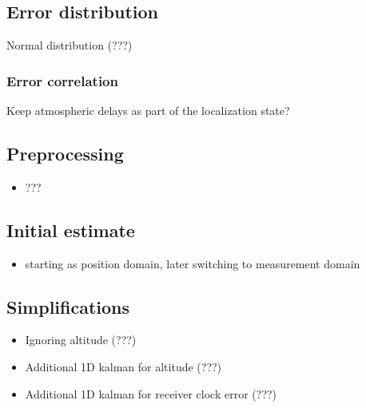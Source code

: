 \subsection{Error distribution}
Normal distribution (???)

\subsubsection{Error correlation}
\label{sec:measurement_domain_correlation}
Keep atmospheric delays as part of the localization state?

\subsection{Preprocessing}
\begin{itemize}
\item ???
\end{itemize}

\subsection{Initial estimate}
\begin{itemize}
\item starting as position domain, later switching to measurement domain
\end{itemize}

\subsection{Simplifications}
\begin{itemize}
\item Ignoring altitude (???)
\item Additional 1D kalman for altitude (???)
\item Additional 1D kalman for receiver clock error (???)
\end{itemize}
